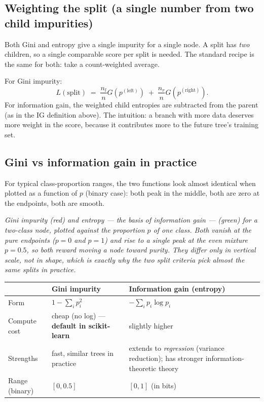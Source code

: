 \documentclass[11pt, a4paper]{article}
\newcommand{\thead}[1]{\textbf{#1}}
\begin{document}
\subsection{Weighting the split (a single number from two child impurities)}

Both Gini and entropy give a single impurity for a single node. A split has \emph{two} children, so a single comparable score per split is needed. The standard recipe is the same for both: take a count-weighted average.

For Gini impurity:
\[
L(\text{split}) \;=\; \frac{n_l}{n} G(p^{(\text{left})}) \;+\; \frac{n_r}{n} G(p^{(\text{right})}).
\]
For information gain, the weighted child entropies are subtracted from the parent (as in the IG definition above). The intuition: a branch with more data deserves more weight in the score, because it contributes more to the future tree's training set.

\subsection{Gini vs information gain in practice}

For typical class-proportion ranges, the two functions look almost identical when plotted as a function of $p$ (binary case): both peak in the middle, both are zero at the endpoints, both are smooth.

\begin{center}

\footnotesize\textit{Gini impurity (red) and entropy --- the basis of information gain --- (green) for a two-class node, plotted against the proportion $p$ of one class. Both vanish at the pure endpoints ($p=0$ and $p=1$) and rise to a single peak at the even mixture $p=0.5$, so both reward moving a node toward purity. They differ only in vertical scale, not in shape, which is exactly why the two split criteria pick almost the same splits in practice.}
\end{center}

\begin{center}
\renewcommand{\arraystretch}{1.2}
\begin{tabularx}{\linewidth}{l X X}
\toprule
& \thead{Gini impurity} & \thead{Information gain (entropy)} \\
\midrule
Form & $1 - \sum_i p_i^2$ & $-\sum_i p_i \log p_i$ \\
Compute cost & cheap (no log) — \textbf{default in scikit-learn} & slightly higher \\
Strengths & fast, similar trees in practice & extends to \emph{regression} (variance reduction); has stronger information-theoretic theory \\
Range (binary) & $[0, 0.5]$ & $[0, 1]$ (in bits) \\
\bottomrule
\end{tabularx}
\end{center}
\end{document}

